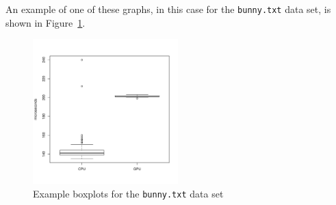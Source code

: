 An example of one of these graphs, in this case for the \texttt{bunny.txt} data set, is shown in Figure~\ref{fig:bunny_box}.

\begin{figure}
	\center
	\includegraphics[width=0.5\textwidth]{results/bunny.pdf}
	\caption{Example boxplots for the \texttt{bunny.txt} data set}
	\label{fig:bunny_box}
\end{figure}

